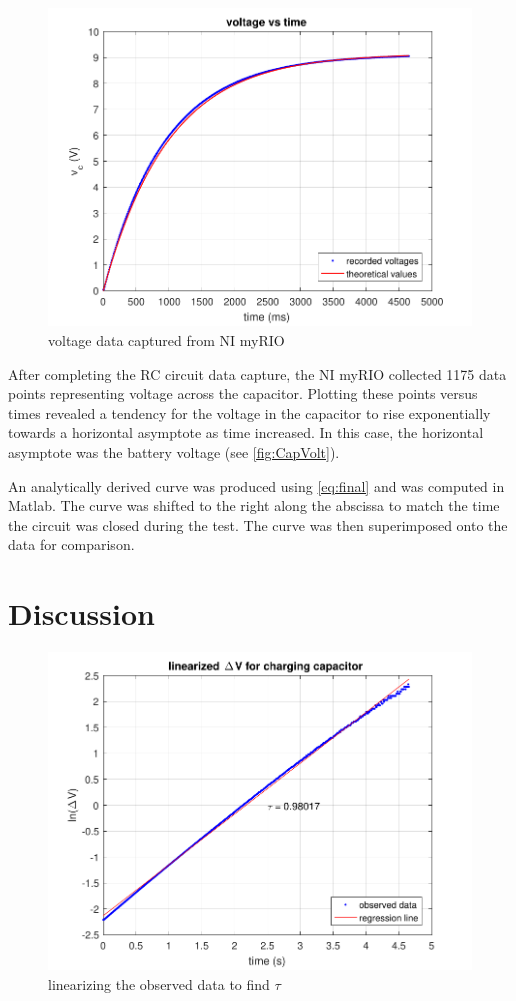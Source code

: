 \documentclass[10pt,twocolumn]{article}
\begin{document}
\begin{figure}[hbt]
	\centering
	\includegraphics[width=.9\linewidth]{figures/capCharge.pdf}
	\caption{voltage data captured from NI myRIO}
	\label{fig:CapVolt}
\end{figure}

After completing the RC circuit data capture, the NI myRIO collected 1175 data points representing voltage across the capacitor. Plotting these points versus times revealed a tendency for the voltage in the capacitor to rise exponentially towards a horizontal asymptote as time increased. In this case, the horizontal asymptote was the battery voltage (see \autoref{fig:CapVolt}).

	An analytically derived curve was produced using \autoref{eq:final} and was computed in Matlab. The curve was shifted to the right along the abscissa to match the time the circuit was closed during the test. The curve was then superimposed onto the data for comparison.


\section{Discussion}

\begin{figure}[hbt]
	\centering
	\includegraphics[width=.9\linewidth]{figures/linear.pdf}
	\caption{linearizing the observed data to find $\tau$ }
	\label{fig:lin}
\end{figure}
\end{document}
